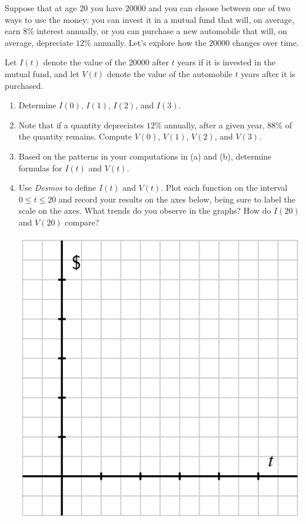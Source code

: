 \documentclass[nooutcomes]{ximera}
\begin{document}
\begin{exploration}
Suppose that at age $20$ you have \textdollar{}$20000$ and you can choose between one of two ways to use the money:  you can invest it in a mutual fund that will, on average, earn $8$\% interest annually, or you can purchase a new automobile that will, on average, depreciate $12$\% annually.  Let's explore how the $20000$ changes over time.%

Let $I(t)$ denote the value of the \textdollar{}$20000$ after $t$ years if it is invested in the mutual fund, and let $V(t)$ denote the value of the automobile $t$ years after it is purchased.

\begin{enumerate}[label=\alph*.]
\item Determine $I(0)$, $I(1)$, $I(2)$, and $I(3)$.
\item Note that if a quantity depreciates $12$\% annually, after a given year, $88$\% of the quantity remains.  Compute $V(0)$, $V(1)$, $V(2)$, and $V(3)$.
\item Based on the patterns in your computations in (a) and (b), determine formulas for $I(t)$ and $V(t)$.
\item Use \emph{Desmos} to define $I(t)$ and $V(t)$.  Plot each function on the interval $0 \le t \le 20$ and record your results on the axes below, being sure to label the scale on the axes.  What trends do you observe in the graphs?  How do $I(20)$ and $V(20)$ compare?
\begin{image}
\includegraphics{growth-PA-blank-axes.jpg}
\end{image}
\end{enumerate}
\end{exploration}
\end{document}
